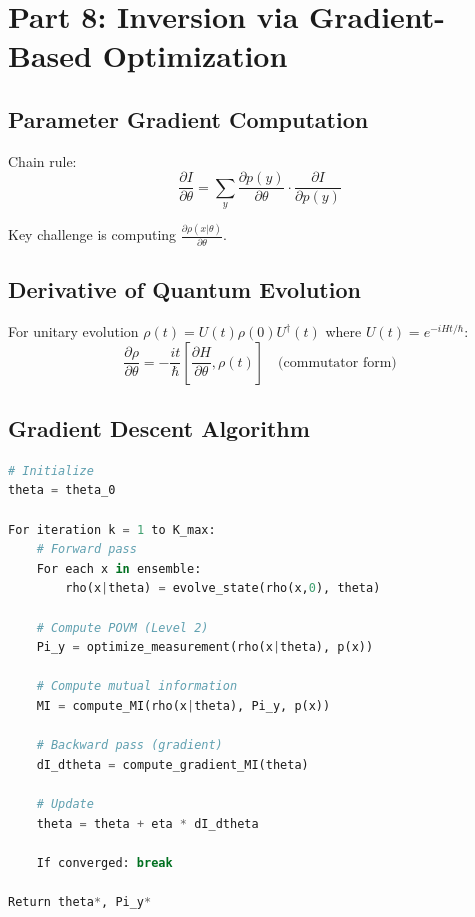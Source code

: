 \documentclass[11pt,a4paper]{article}
\begin{document}
\section{Part 8: Inversion via Gradient-Based Optimization}

\subsection{Parameter Gradient Computation}

Chain rule: 
\begin{equation}
\frac{\partial I}{\partial\theta} = \sum_y \frac{\partial p(y)}{\partial\theta} \cdot \frac{\partial I}{\partial p(y)}
\end{equation}

Key challenge is computing $\frac{\partial\rho(x|\theta)}{\partial\theta}$.

\subsection{Derivative of Quantum Evolution}

For unitary evolution $\rho(t) = U(t)\rho(0)U^\dagger(t)$ where $U(t) = e^{-iHt/\hbar}$:
\begin{equation}
\frac{\partial\rho}{\partial\theta} = -\frac{it}{\hbar}\left[\frac{\partial H}{\partial\theta}, \rho(t)\right] \quad \text{(commutator form)}
\end{equation}

\subsection{Gradient Descent Algorithm}

\begin{lstlisting}[language=Python, caption=Pseudocode for theta optimization]
# Initialize
theta = theta_0

For iteration k = 1 to K_max:
    # Forward pass
    For each x in ensemble:
        rho(x|theta) = evolve_state(rho(x,0), theta)
    
    # Compute POVM (Level 2)
    Pi_y = optimize_measurement(rho(x|theta), p(x))
    
    # Compute mutual information
    MI = compute_MI(rho(x|theta), Pi_y, p(x))
    
    # Backward pass (gradient)
    dI_dtheta = compute_gradient_MI(theta)
    
    # Update
    theta = theta + eta * dI_dtheta
    
    If converged: break

Return theta*, Pi_y*
\end{lstlisting}
\end{document}
